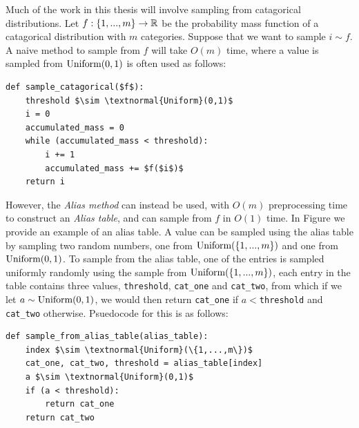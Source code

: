 


    Much of the work in this thesis will involve sampling from catagorical distributions. Let $f:\{1,...,m\}\rightarrow\mathbb{R}$ be the probability mass function of a catagorical distribution with $m$ categories. Suppose that we want to sample $i\sim f$. A naive method to sample from $f$ will take $O(m)$ time, where a value is sampled from $\textnormal{Uniform}(0,1)$ is often used as follows:

    \begin{lstlisting}
def sample_catagorical($f$):
    threshold $\sim \textnormal{Uniform}(0,1)$
    i = 0
    accumulated_mass = 0
    while (accumulated_mass < threshold):
        i += 1
        accumulated_mass += $f($i$)$
    return i
    \end{lstlisting}

    However, the \textit{Alias method}  can instead be used, with $O(m)$ preprocessing time to construct an \textit{Alias table}, and can sample from $f$ in $O(1)$ time. In Figure  we provide an example of an alias table. A value can be sampled using the alias table by sampling two random numbers, one from $\textnormal{Uniform}(\{1,...,m\})$ and one from $\textnormal{Uniform}(0,1)$. To sample from the alias table, one of the entries is sampled uniformly randomly using the sample from $\textnormal{Uniform}(\{1,...,m\})$, each entry in the table contains three values, \texttt{threshold}, \texttt{cat\_one} and \texttt{cat\_two}, from which if we let $a\sim\textnormal{Uniform}(0,1)$, we would then return \texttt{cat\_one} if $a<$\texttt{threshold} and \texttt{cat\_two} otherwise. Psuedocode for this is as follows:

    \begin{lstlisting}
def sample_from_alias_table(alias_table):
    index $\sim \textnormal{Uniform}(\{1,...,m\})$
    cat_one, cat_two, threshold = alias_table[index]
    a $\sim \textnormal{Uniform}(0,1)$
    if (a < threshold):
        return cat_one 
    return cat_two
    \end{lstlisting}

